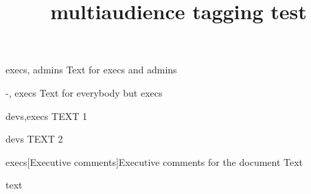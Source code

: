 \documentclass{article}
\title{multiaudience tagging test}
\begin{document}
\begin{shownto}{execs, admins}
Text for execs and admins
\end{shownto}
\begin{shownto}{-, execs}
Text for everybody but execs
\end{shownto}


\begin{shownto}{devs,execs}
TEXT 1
\begin{shownto}{devs}
TEXT 2
\end{shownto}
\end{shownto}

\begin{Section}{execs}[Executive comments]{Executive comments for
the document}
Text
\end{Section}

text
\end{document}
